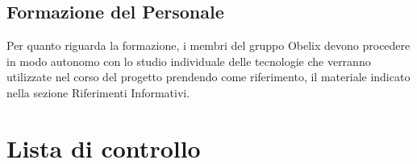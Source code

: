 \subsection{Formazione del Personale} Per quanto riguarda la formazione, i membri del gruppo Obelix devono procedere in modo autonomo con lo studio individuale delle tecnologie che verranno utilizzate nel corso del progetto prendendo come riferimento, il materiale indicato nella sezione Riferimenti Informativi.

\clearpage

\appendix



\section{Lista di controllo}



